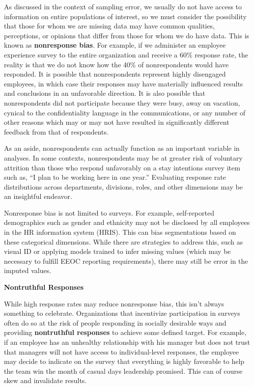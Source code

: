 \documentclass[
]{book}
\begin{document}
As discussed in the context of sampling error, we usually do not have access to information on entire populations of interest, so we must consider the possibility that those for whom we are missing data may have common qualities, perceptions, or opinions that differ from those for whom we do have data. This is known as \textbf{nonresponse bias}. For example, if we administer an employee experience survey to the entire organization and receive a 60\% response rate, the reality is that we do not know how the 40\% of nonrespondents would have responded. It is possible that nonrespondents represent highly disengaged employees, in which case their responses may have materially influenced results and conclusions in an unfavorable direction. It is also possible that nonrespondents did not participate because they were busy, away on vacation, cynical to the confidentiality language in the communications, or any number of other reasons which may or may not have resulted in significantly different feedback from that of respondents.

As an aside, nonrespondents can actually function as an important variable in analyses. In some contexts, nonrespondents may be at greater risk of voluntary attrition than those who respond unfavorably on a stay intentions survey item such as, ``I plan to be working here in one year.'' Evaluating response rate distributions across departments, divisions, roles, and other dimensions may be an insightful endeavor.

Nonresponse bias is not limited to surveys. For example, self-reported demographics such as gender and ethnicity may not be disclosed by all employees in the HR information system (HRIS). This can bias segmentations based on these categorical dimensions. While there are strategies to address this, such as visual ID or applying models trained to infer missing values (which may be necessary to fulfill EEOC reporting requirements), there may still be error in the imputed values.

\textbf{Nontruthful Responses}

While high response rates may reduce nonresponse bias, this isn't always something to celebrate. Organizations that incentivize participation in surveys often do so at the risk of people responding in socially desirable ways and providing \textbf{nontruthful responses} to achieve some defined target. For example, if an employee has an unhealthy relationship with his manager but does not trust that managers will not have access to individual-level responses, the employee may decide to indicate on the survey that everything is highly favorable to help the team win the month of casual days leadership promised. This can of course skew and invalidate results.
\end{document}
